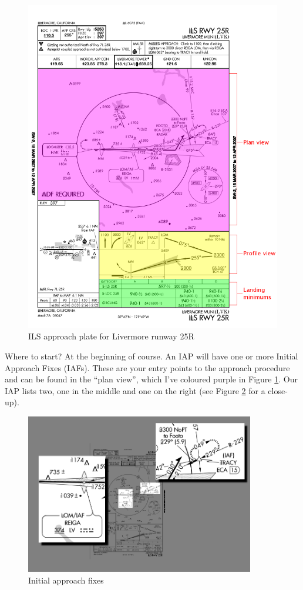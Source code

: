 \begin{figure}
  \begin{center}
    \includegraphics[width=14cm]{img/big_plate}
    \caption{ILS approach plate for Livermore runway 25R}
    \label{fig:big_plate}
  \end{center}
\end{figure}

Where to start?  At the beginning of course.  An IAP will have one or
more Initial Approach Fixes (IAFs).  These are your entry points to
the approach procedure and can be found in the ``plan view'', which
I've coloured purple in Figure \ref{fig:big_plate}.  Our IAP lists
two, one in the middle and one on the right (see Figure \ref{fig:IAFs}
for a close-up).

\begin{figure}
  \begin{center}
    \includegraphics[width=10cm]{img/IAFs}
    \caption{Initial approach fixes}
    \label{fig:IAFs}
  \end{center}
\end{figure}

